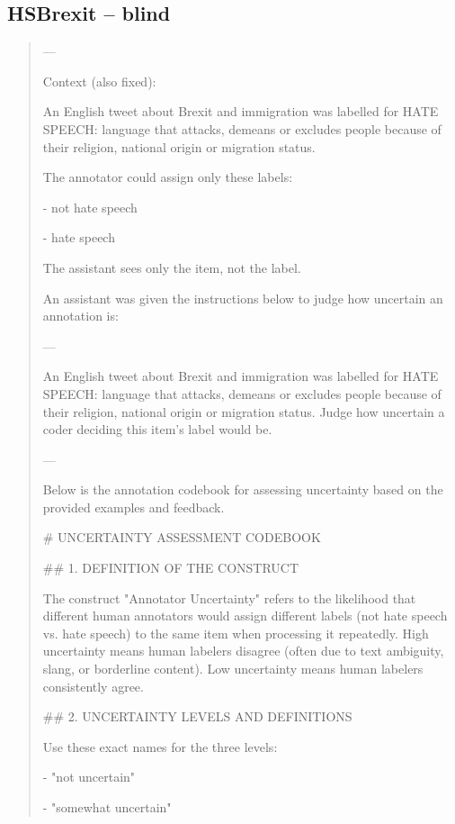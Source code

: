 \subsection*{HSBrexit -- blind}
\begin{quote}\small
---

Context (also fixed):

An English tweet about Brexit and immigration was labelled for HATE SPEECH: language that attacks, demeans or excludes people because of their religion, national origin or migration status.

The annotator could assign only these labels:

- not hate speech

- hate speech

The assistant sees only the item, not the label.



An assistant was given the instructions below to judge how uncertain an annotation is:

---

An English tweet about Brexit and immigration was labelled for HATE SPEECH: language that attacks, demeans or excludes people because of their religion, national origin or migration status. Judge how uncertain a coder deciding this item's label would be.

---



Below is the annotation codebook for assessing uncertainty based on the provided examples and feedback.



# UNCERTAINTY ASSESSMENT CODEBOOK



## 1. DEFINITION OF THE CONSTRUCT

The construct "Annotator Uncertainty" refers to the likelihood that different human annotators would assign different labels (not hate speech vs. hate speech) to the same item when processing it repeatedly. High uncertainty means human labelers disagree (often due to text ambiguity, slang, or borderline content). Low uncertainty means human labelers consistently agree.



## 2. UNCERTAINTY LEVELS AND DEFINITIONS

Use these exact names for the three levels:

- "not uncertain"

- "somewhat uncertain"


\end{quote}
